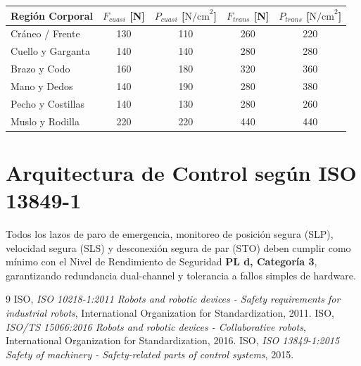 \documentclass[11pt,a4paper]{article}
\begin{document}
\begin{table}[h]
\centering
\begin{tabular}{lcccc}
\hline
\textbf{Región Corporal} & \textbf{$F_{cuasi}$ [N]} & \textbf{$P_{cuasi}$ [$\text{N/cm}^2$]} & \textbf{$F_{trans}$ [N]} & \textbf{$P_{trans}$ [$\text{N/cm}^2$]} \\
\hline
Cráneo / Frente & 130 & 110 & 260 & 220 \\
Cuello y Garganta & 140 & 140 & 280 & 280 \\
Brazo y Codo & 160 & 180 & 320 & 360 \\
Mano y Dedos & 140 & 190 & 280 & 380 \\
Pecho y Costillas & 140 & 130 & 280 & 260 \\
Muslo y Rodilla & 220 & 220 & 440 & 440 \\
\hline
\end{tabular}
\end{table}

\section{Arquitectura de Control según ISO 13849-1}
Todos los lazos de paro de emergencia, monitoreo de posición segura (SLP), velocidad segura (SLS) y desconexión segura de par (STO) deben cumplir como mínimo con el Nivel de Rendimiento de Seguridad \textbf{PL d, Categoría 3}, garantizando redundancia dual-channel y tolerancia a fallos simples de hardware.

\begin{thebibliography}{9}
 ISO, \textit{ISO 10218-1:2011 Robots and robotic devices - Safety requirements for industrial robots}, International Organization for Standardization, 2011.
 ISO, \textit{ISO/TS 15066:2016 Robots and robotic devices - Collaborative robots}, International Organization for Standardization, 2016.
 ISO, \textit{ISO 13849-1:2015 Safety of machinery - Safety-related parts of control systems}, 2015.
\end{thebibliography}
\end{document}
